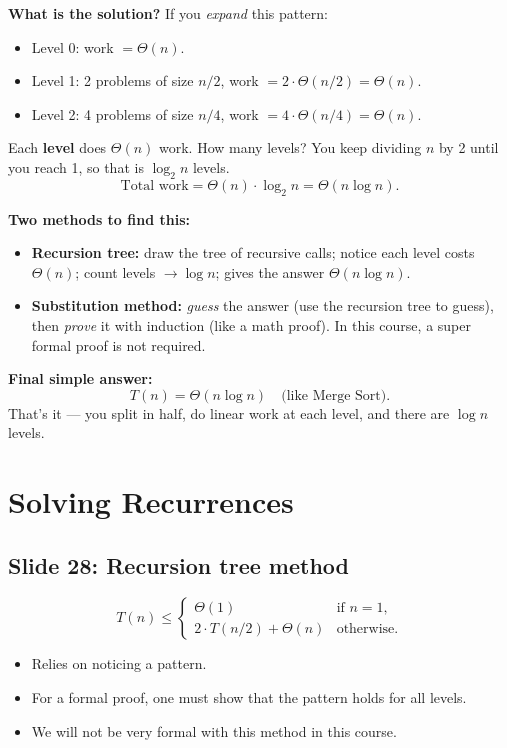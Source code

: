 \documentclass[11pt]{article}
\newcommand{\slide}[2]{\subsection*{Slide #1: #2}}
\begin{document}
\textbf{What is the solution?}
If you \emph{expand} this pattern:
\begin{itemize}
  \item Level 0: work $= \Theta(n)$.
  \item Level 1: 2 problems of size $n/2$, work $= 2 \cdot \Theta(n/2) = \Theta(n)$.
  \item Level 2: 4 problems of size $n/4$, work $= 4 \cdot \Theta(n/4) = \Theta(n)$.
\end{itemize}
Each \textbf{level} does $\Theta(n)$ work. How many levels? You keep dividing $n$ by 2 until
you reach 1, so that is $\log_2 n$ levels.
\[
  \text{Total work} = \Theta(n) \cdot \log_2 n = \Theta(n \log n).
\]

\textbf{Two methods to find this:}
\begin{itemize}
  \item \textbf{Recursion tree:} draw the tree of recursive calls; notice each level costs
        $\Theta(n)$; count levels $\to \log n$; gives the answer $\Theta(n \log n)$.
  \item \textbf{Substitution method:} \emph{guess} the answer (use the recursion tree to
        guess), then \emph{prove} it with induction (like a math proof). In this course, a
        super formal proof is not required.
\end{itemize}

\textbf{Final simple answer:}
\[
  T(n) = \Theta(n \log n) \quad \text{(like Merge Sort).}
\]
That's it --- you split in half, do linear work at each level, and there are $\log n$ levels.

\section{Solving Recurrences}

\slide{28}{Recursion tree method}
\[
  T(n) \le
  \begin{cases}
    \Theta(1) & \text{if } n = 1,\\[0.5ex]
    2 \cdot T(n/2) + \Theta(n) & \text{otherwise.}
  \end{cases}
\]
\begin{itemize}
  \item Relies on noticing a pattern.
  \item For a formal proof, one must show that the pattern holds for all levels.
  \item We will not be very formal with this method in this course.
\end{itemize}
\end{document}
